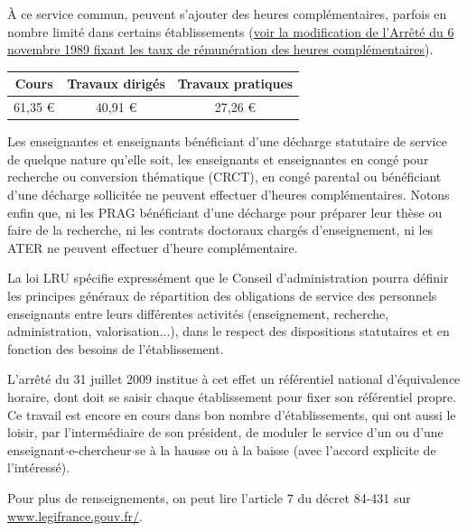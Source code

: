 \`A ce service commun, peuvent s'ajouter des heures
compl\'ementaires, parfois en nombre limit\'e dans certains \'etablissements (\href{http://www.legifrance.gouv.fr/affichTexte.do?cidTexte=JORFTEXT000000315917&dateTexte=20121122}{voir la modification de l'Arr\^et\'e du 6 novembre 1989 fixant les taux de r\'emun\'eration des heures compl\'ementaires}).

\begin{table}[!ht]
\begin{center}
\begin{tabular}{|c|c|c|}
\hline
Cours & Travaux dirig\'es & Travaux pratiques\\
\hline
61,35 \euro & 40,91 \euro & 27,26 \euro\\
\hline
\end{tabular}
\end{center}
\end{table}
Les enseignantes et enseignants b\'en\'eficiant d'une d\'echarge statutaire de service de quelque
nature qu'elle soit, les enseignants et enseignantes en cong\'e pour recherche ou
conversion th\'ematique (CRCT), en cong\'e parental ou b\'en\'eficiant d'une
d\'echarge sollicit\'ee ne peuvent effectuer d'heures
compl\'ementaires. Notons enfin
que, ni les PRAG b\'en\'eficiant d'une d\'echarge pour
pr\'eparer leur th\`ese ou faire de la recherche,
ni les contrats doctoraux charg\'es d'enseignement,
ni les ATER ne peuvent effectuer d'heure compl\'ementaire.

La loi LRU sp\'ecifie express\'ement que le Conseil
d'administration pourra d\'efinir les principes g\'en\'eraux de
r\'epartition des obligations de service des personnels enseignants
entre leurs diff\'erentes activit\'es (enseignement, recherche,
administration, valorisation...), dans le respect des dispositions
statutaires et en fonction des besoins de l'\'etablissement.

\label{referentiel}
L'arr\^et\'e du 31 juillet 2009 institue \`a cet effet un r\'ef\'erentiel
national d'\'equivalence horaire, dont doit se saisir chaque \'etablissement
pour fixer son r\'ef\'erentiel propre. Ce travail est encore en cours dans bon nombre
d'\'etablissements, qui ont aussi le loisir, par l'interm\'ediaire de son pr\'esident,
de moduler le service d'un ou d'une enseignant$\cdot$e-chercheur$\cdot$se \`a la hausse ou \`a la baisse (avec l'accord
explicite de l'int\'eress\'e).

Pour plus de renseignements, on peut lire l'article 7 du d\'ecret 84-431 sur
\url{www.legifrance.gouv.fr/}.

